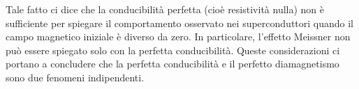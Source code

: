 Tale fatto ci dice che la conducibilità perfetta (cioè resistività nulla) non è sufficiente per spiegare il comportamento osservato nei superconduttori quando il campo magnetico iniziale è diverso da zero. In particolare, l'effetto Meissner non può essere spiegato solo con la perfetta conducibilità. Queste considerazioni ci portano a concludere che la perfetta conducibilità e il perfetto diamagnetismo sono due fenomeni indipendenti.
